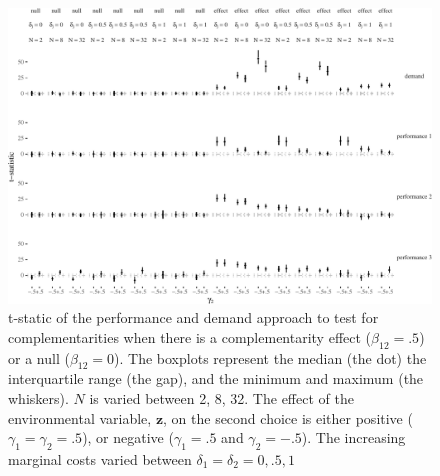 \documentclass[12pt]{article}
\begin{document}
\begin{figure}

\includegraphics[width=500px]{figure-latex/unnamed-chunk-9-1}
\caption[The Error Rate and Power with Different Levels of Marginal Costs]
{\label{delta} t-static of the performance and demand approach to test
for complementarities when there is a complementarity effect ($\beta_{12} = .5$)
or a null ($\beta_{12} = 0$). The boxplots represent the median (the dot) the
interquartile range (the gap), and the minimum and maximum (the whiskers). $N$
is varied between 2, 8, 32. The effect of the environmental
variable, $\mathbf{z}$, on the second choice is either positive
($\gamma_1 = \gamma_2 = .5$), or negative ($\gamma_1 = .5$ and $\gamma_2 = -.5$).
The increasing marginal costs varied between $\delta_1 = \delta_2 = 0, .5, 1$}
\end{figure}
\end{document}
